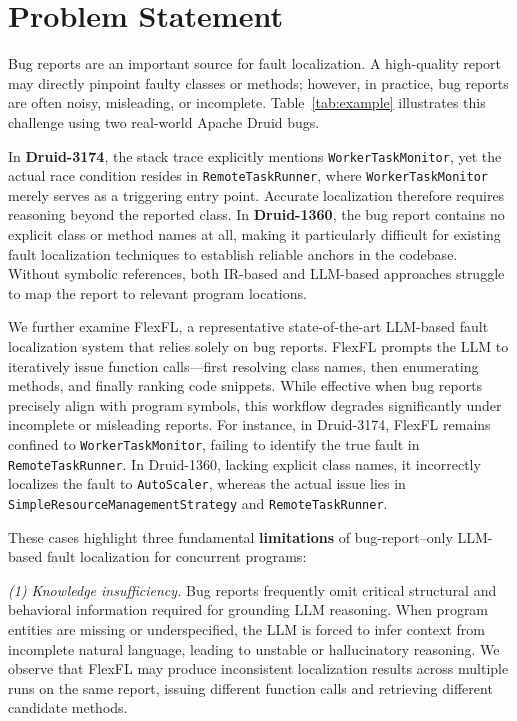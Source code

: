 \section{Problem Statement}

Bug reports are an important source for fault localization.
A high-quality report may directly pinpoint faulty classes or methods; however, in practice, bug reports are often noisy, misleading, or incomplete.
Table~\ref{tab:example} illustrates this challenge using two real-world Apache Druid bugs.

In \textbf{Druid-3174}, the stack trace explicitly mentions \texttt{WorkerTaskMonitor}, yet the actual race condition resides in \texttt{RemoteTaskRunner}, where \texttt{WorkerTaskMonitor} merely serves as a triggering entry point.
Accurate localization therefore requires reasoning beyond the reported class.
In \textbf{Druid-1360}, the bug report contains no explicit class or method names at all, making it particularly difficult for existing fault localization techniques to establish reliable anchors in the codebase.
Without symbolic references, both IR-based and LLM-based approaches struggle to map the report to relevant program locations.



We further examine FlexFL, a representative state-of-the-art LLM-based fault localization system that relies solely on bug reports.
FlexFL prompts the LLM to iteratively issue function calls—first resolving class names, then enumerating methods, and finally ranking code snippets.
While effective when bug reports precisely align with program symbols, this workflow degrades significantly under incomplete or misleading reports.
For instance, in Druid-3174, FlexFL remains confined to \texttt{WorkerTaskMonitor}, failing to identify the true fault in \texttt{RemoteTaskRunner}.
In Druid-1360, lacking explicit class names, it incorrectly localizes the fault to \texttt{AutoScaler}, whereas the actual issue lies in \texttt{SimpleResourceManagementStrategy} and \texttt{RemoteTaskRunner}.

These cases highlight three fundamental \textbf{limitations} of bug-report–only LLM-based fault localization for concurrent programs:

\textit{(1) Knowledge insufficiency.}
Bug reports frequently omit critical structural and behavioral information required for grounding LLM reasoning.
When program entities are missing or underspecified, the LLM is forced to infer context from incomplete natural language, leading to unstable or hallucinatory reasoning.
We observe that FlexFL may produce inconsistent localization results across multiple runs on the same report, issuing different function calls and retrieving different candidate methods.

